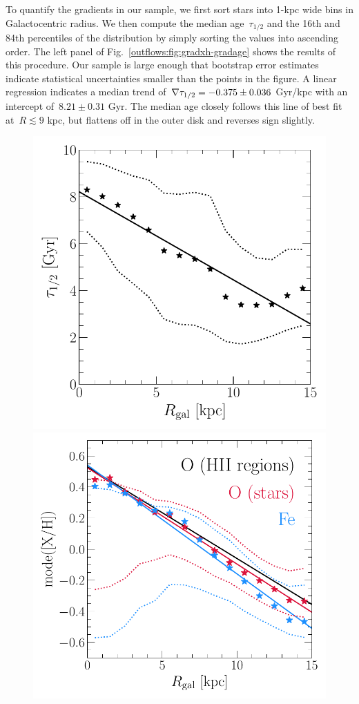 To quantify the gradients in our sample, we first sort stars into 1-kpc wide
bins in Galactocentric radius.
We then compute the median age~$\tau_{1/2}$ and the 16th and 84th percentiles
of the distribution by simply sorting the values into ascending order.
The left panel of Fig.~\ref{outflows:fig:gradxh-gradage} shows the results of
this procedure.
Our sample is large enough that bootstrap error estimates indicate statistical
uncertainties smaller than the points in the figure.
A linear regression indicates a median trend of~$\nabla\tau_{1/2} = -0.375 \pm 0.036$
Gyr/kpc with an intercept of~$8.21 \pm 0.31$ Gyr.
The median age closely follows this line of best fit at~$R \lesssim 9$ kpc, but
flattens off in the outer disk and reverses sign slightly.

\begin{figure}
\centering
\includegraphics[scale = 0.51]{age_gradient.pdf}
\includegraphics[scale = 0.5]{gradxh.pdf}

\end{figure}
